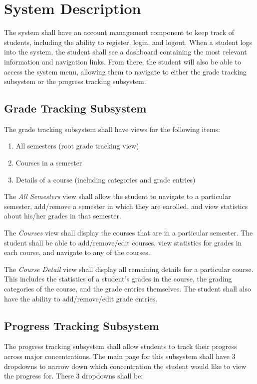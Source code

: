 \documentclass[12pt]{article}
\begin{document}
\section{System Description}
The system shall have an account management component to keep track of students, including the
ability to register, login, and logout. When a student logs into the system, the student shall see a
dashboard containing the most relevant information and navigation links. From there, the student
will also be able to access the system menu, allowing them to navigate to either the grade tracking
subsystem or the progress tracking subsystem.

\subsection{Grade Tracking Subsystem}
\noindent
The grade tracking subsystem shall have views for the following items:

\begin{enumerate}
    \item All semesters (root grade tracking view)
    \item Courses in a semester
    \item Details of a course (including categories and grade entries)
\end{enumerate}

The \textit{All Semesters} view shall allow the student to navigate to a particular semester,
add/remove a semester in which they are enrolled, and view statistics about his/her grades in that
semester.

The \textit{Courses} view shall display the courses that are in a particular semester. The student
shall be able to add/remove/edit courses, view statistics for grades in each course, and navigate
to any of the courses.

The \textit{Course Detail} view shall display all remaining details for a particular course. This
includes the statistics of a student's grades in the course, the grading categories of the course,
and the grade entries themselves. The student shall also have the ability to add/remove/edit grade
entries.

\subsection{Progress Tracking Subsystem}
\noindent
The progress tracking subsystem shall allow students to track their progress across major
concentrations. The main page for this subsystem shall have 3 dropdowns to narrow down which
concentration the student would like to view the progress for. These 3 dropdowns shall be:
\end{document}
